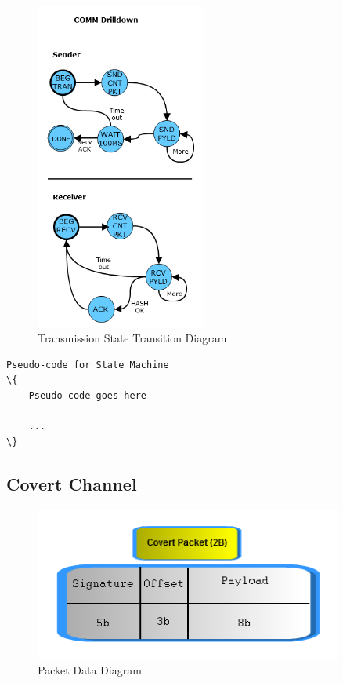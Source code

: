 \documentclass[titlepage]{article}
\begin{document}
\begin{figure}[htb]                                                                       
  \begin{center}
    \includegraphics[width=0.5\textwidth]{imgs/comm.png}
  \end{center}
  \caption{Transmission State Transition Diagram}
  \label{fig:comm}
\end{figure}

\begin{lstlisting}
Pseudo-code for State Machine
\{
	Pseudo code goes here

	...
\}
\end{lstlisting}

\subsection{Covert Channel}

\begin{figure}[htb]                                                                       
  \begin{center}
    \includegraphics[width=0.9\textwidth]{imgs/packet.png}
  \end{center}
  \caption{Packet Data Diagram}
  \label{fig:packet}
\end{figure}
\end{document}
